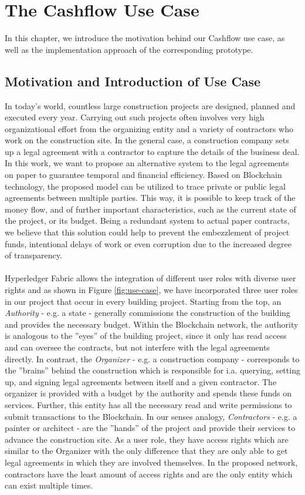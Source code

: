 \section{The Cashflow Use Case} \label{use-case}
In this chapter, we introduce the motivation behind our Cashflow use case, as well as the implementation approach of the corresponding prototype. 

\subsection{Motivation and Introduction of Use Case} \label{motivation}
In today's world, countless large construction projects are designed, planned and executed every year. Carrying out such projects often involves very high organizational effort from the organizing entity and a variety of contractors who work on the construction site. In the general case, a construction company sets up a legal agreement with a contractor to capture the details of the business deal. 
In this work, we want to propose an alternative system to the legal agreements on paper to guarantee temporal and financial efficiency. Based on Blockchain technology, the proposed model can be utilized to trace private or public legal agreements between multiple parties. This way, it is possible to keep track of the money flow, and of further important characteristics, such as the current state of the project, or its budget. Being a redundant system to actual paper contracts, we believe that this solution could help to prevent the embezzlement of project funds, intentional delays of work or even corruption due to the increased degree of transparency. \\ \\
Hyperledger Fabric allows the integration of different user roles with diverse user rights and as shown in Figure \ref{fig:use-case}, we have incorporated three user roles in our project that occur in every building project.
Starting from the top, an \textit{Authority} - e.g. a state - generally commissions the construction of the building and provides the necessary budget. Within the Blockchain network, the authority is analogous to the ''eyes'' of the building project, since it only has read access and can oversee the contracts, but not interfere with the legal agreements directly. 
In contrast, the \textit{Organizer} - e.g. a construction company - corresponds to the ''brains'' behind the construction which is responsible for i.a. querying, setting up, and signing legal agreements between itself and a given contractor. The organizer is provided with a budget by the authority and spends these funds on services. Further, this entity has all the necessary read and write permissions to submit transactions to the Blockchain. 
In our senses analogy, \textit{Contractors} - e.g. a painter or architect - are the ''hands'' of the project and provide their services to advance the construction site. As a user role, they have access rights which are similar to the Organizer with the only difference that they are only able to get legal agreements in which they are involved themselves. In the proposed network, contractors have the least amount of access rights and are the only entity which can exist multiple times.

